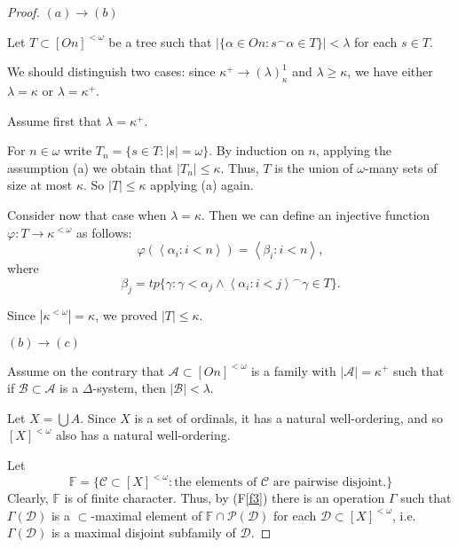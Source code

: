 \documentclass[a4paper,10pt,reqno]{amsart}
\numberwithin{equation}{section}
\theoremstyle{definition}
\theoremstyle{remark}
\newcommand{\mc}[1]{\mathcal{#1}}
\newcommand{\mbb}[1]{\mathbb{#1}}
\newcommand{\subs}{\subset}
\def\<{\left\langle}
\def\>{\right\rangle}
\begin{document}
\begin{proof}
$(a)\to(b)$

Let     
 $T\subs {[On]}^{<{\omega}}$ be a  tree such that 
$|\{{\alpha}\in On:s^\frown {\alpha}\in T\}|<{\lambda}$ 
for each $s\in T$.

We should distinguish two cases: since ${\kappa}^+\to ({\lambda})^1_{\kappa}$
and ${\lambda}\ge {\kappa}$, we have either ${\lambda}={\kappa}$ or ${\lambda}={\kappa}^+$.


Assume first that  ${\lambda}={\kappa}^+$.  

For $n\in {\omega}$ write  $T_n=\{s\in T: |s|={\omega}\}$.
By induction on $n$, applying the assumption (a) 
we obtain that $|T_n|\le {\kappa}$.
Thus,  $T$ is the union of ${\omega}$-many sets of size at most 
${\kappa}$.  So $|T|\le {\kappa}$  applying 
(a) again.


Consider now that case when ${\lambda}={\kappa}$.
Then we can define an injective function 
${\varphi}:T\to {\kappa}^{<{\omega}}$ as follows:
\begin{displaymath}
{\varphi}(\<{\alpha}_i:i<n\>)=\<{\beta}_i:i<n\>,
\end{displaymath} 
where 
\begin{displaymath}
{\beta}_j=tp\{{\gamma}:{\gamma}<{\alpha}_j\land 
\<{\alpha}_i:i<j\>^\frown {\gamma}\in T\}.
\end{displaymath}

Since $|{\kappa}^{<{\omega}}|={\kappa}$, we proved 
$|T|\le {\kappa}$.

\smallskip

\noindent $(b)\to (c)$

Assume on the contrary that $\mc A\subs {[On]}^{<{\omega}}$ is a family with 
$|\mc A|={\kappa}^+$  
such that  if $\mc B\subs \mc A$ is a $\Delta$-system, then $|\mc B|< {\lambda}$.

Let $X=\bigcup A$. Since $X$ is a set of ordinals, it has a natural well-ordering,
and so ${[X]}^{<{\omega}}$  also has a natural well-ordering.



Let 
\begin{displaymath}
\mbb F=\{\mc C\subs {[X]}^{<{\omega}}:   \text{the elements of $\mc C$ are pairwise disjoint.}\}
\end{displaymath}
Clearly, $\mbb F$ is of finite character. Thus, by (F\ref{f3}) there is an operation $\Gamma$ such that $\Gamma(\mc D)$ is a $\subs$-maximal 
element of $\mbb F\cap \mc P(\mc D)$ for each $\mc D\subs {[X]}^{<{\omega}}$, i.e. $\Gamma(\mc D)$ is a maximal disjoint subfamily of 
$\mc D$. 




\end{proof}
\end{document}
